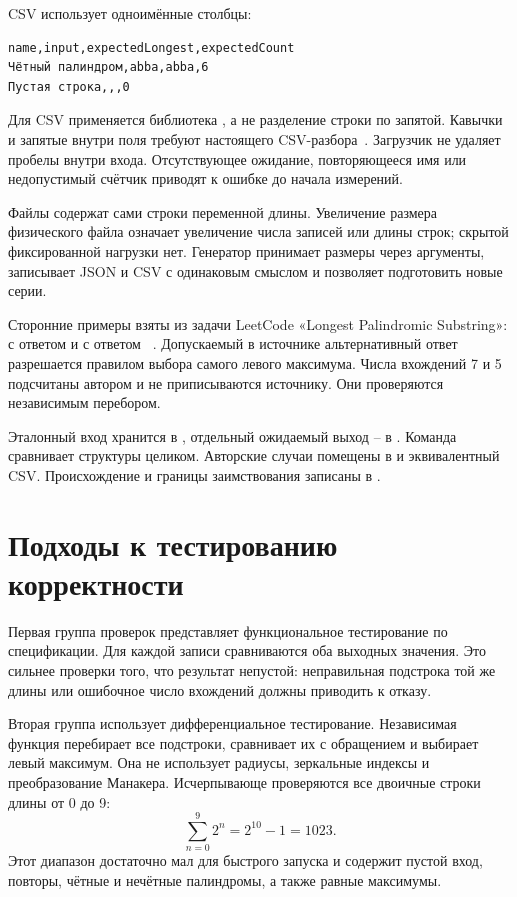 CSV использует одноимённые столбцы:
\begin{Verbatim}[fontsize=\small,frame=single]
name,input,expectedLongest,expectedCount
Чётный палиндром,abba,abba,6
Пустая строка,,,0
\end{Verbatim}
Для CSV применяется библиотека , а не разделение строки по запятой. Кавычки и запятые внутри поля требуют настоящего CSV-разбора~\cite{csv-parse}. Загрузчик не удаляет пробелы внутри входа. Отсутствующее ожидание, повторяющееся имя или недопустимый счётчик приводят к ошибке до начала измерений.

Файлы содержат сами строки переменной длины. Увеличение размера физического файла означает увеличение числа записей или длины строк; скрытой фиксированной нагрузки нет. Генератор принимает размеры через аргументы, записывает JSON и CSV с одинаковым смыслом и позволяет подготовить новые серии.

Сторонние примеры взяты из задачи LeetCode «Longest Palindromic Substring»:  с ответом  и  с ответом ~\cite{leetcode}. Допускаемый в источнике альтернативный ответ  разрешается правилом выбора самого левого максимума. Числа вхождений 7 и 5 подсчитаны автором и не приписываются источнику. Они проверяются независимым перебором.

Эталонный вход хранится в , отдельный ожидаемый выход -- в . Команда  сравнивает структуры целиком. Авторские случаи помещены в  и эквивалентный CSV. Происхождение и границы заимствования записаны в .

\section{Подходы к тестированию корректности}
Первая группа проверок представляет функциональное тестирование по спецификации. Для каждой записи сравниваются оба выходных значения. Это сильнее проверки того, что результат непустой: неправильная подстрока той же длины или ошибочное число вхождений должны приводить к отказу.

Вторая группа использует дифференциальное тестирование. Независимая функция перебирает все подстроки, сравнивает их с обращением и выбирает левый максимум. Она не использует радиусы, зеркальные индексы и преобразование Манакера. Исчерпывающе проверяются все двоичные строки длины от 0 до 9:
\[
 \sum_{n=0}^{9}2^n=2^{10}-1=1023.
\]
Этот диапазон достаточно мал для быстрого запуска и содержит пустой вход, повторы, чётные и нечётные палиндромы, а также равные максимумы.

